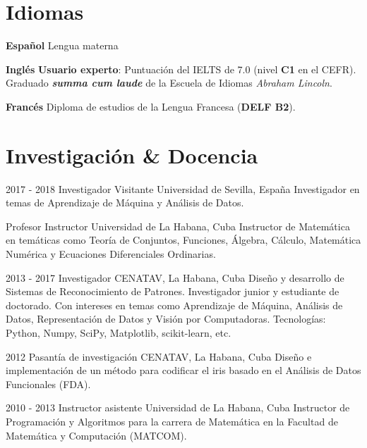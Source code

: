 \documentclass[]{friggeri-cv}
\begin{document}
\section{Idiomas}
\begin{entrylist}
  \entry
    {\textbf{Español}}
    {}
    {}
    {Lengua materna}      

  \entry
    {\textbf{Inglés}}
    {}
    {}
    {
		\textbf{Usuario experto}: Puntuación del IELTS de 7.0 (nivel \textbf{C1} en el CEFR).\\    
    	Graduado \textbf{\emph{summa cum laude}} de la Escuela de Idiomas \emph{Abraham Lincoln}.
    }

  \entry
    {\textbf{Francés}}
    {}
    {}
    {Diploma de estudios de la Lengua Francesa (\textbf{DELF B2}).}
\end{entrylist}


\section{Investigación \& Docencia}
\begin{entrylist}
  \entry
    {2017 - 2018}
    {Investigador Visitante}
    {Universidad de Sevilla, España}
    {Investigador en temas de Aprendizaje de Máquina y Análisis de Datos.\\}

  \entry
    {}
    {Profesor Instructor}
    {Universidad de La Habana, Cuba}
    {Instructor de Matemática en temáticas como Teoría de Conjuntos, Funciones, Álgebra, Cálculo, Matemática Numérica y Ecuaciones Diferenciales Ordinarias.\\}
\end{entrylist}

\begin{entrylist}
  \entry
    {2013 - 2017}
    {Investigador}
    {CENATAV, La Habana, Cuba}
    {Diseño y desarrollo de Sistemas de Reconocimiento de Patrones. Investigador junior y estudiante de doctorado. Con intereses en temas como Aprendizaje de Máquina, Análisis de Datos, Representación de Datos y Visión por Computadoras. Tecnologías: Python, Numpy, SciPy, Matplotlib, scikit-learn, etc.\\}

  \entry
    {2012}
    {Pasantía de investigación}
    {CENATAV, La Habana, Cuba}
    {Diseño e implementación de un método para codificar el iris basado en el Análisis de Datos Funcionales (FDA).\\}

  \entry
    {2010 - 2013}
    {Instructor asistente}
    {Universidad de La Habana, Cuba}
    {Instructor  de Programación y Algoritmos para la carrera de Matemática en la Facultad de Matemática y Computación (MATCOM).\\}
\end{entrylist}
\end{document}
